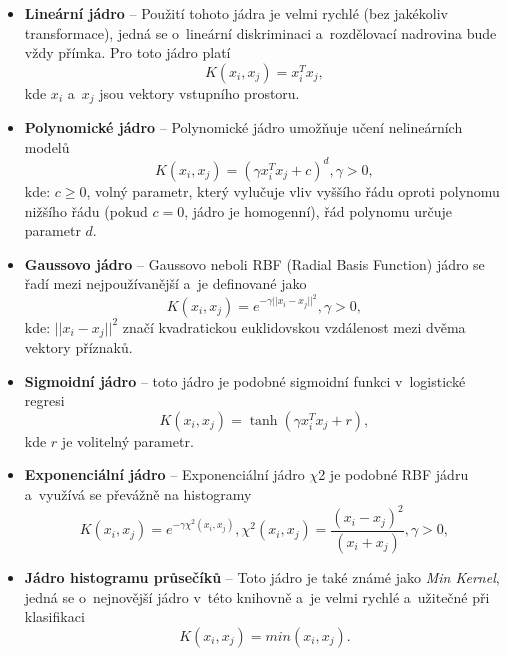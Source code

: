\begin{itemize}
    \item\textbf{Lineární jádro} --
          Použití tohoto jádra je velmi rychlé (bez jakékoliv transformace), jedná se o~lineární diskriminaci a~rozdělovací nadrovina bude vždy přímka. Pro toto jádro platí
          \begin{equation*}
              \label{linearK}
              K(x_i, x_j) = x_i^T x_j,
          \end{equation*}
          kde $x_i$ a~$x_j$ jsou vektory vstupního prostoru.

    \item\textbf{Polynomické jádro} --
          Polynomické jádro umožňuje učení nelineárních modelů
          \begin{equation*}
              \label{polyK}
              K(x_i, x_j) = (\gamma x_i^T x_j + c)^{d}, \gamma > 0,
          \end{equation*}
          kde: $c \geq 0$, volný parametr, který vylučuje vliv vyššího řádu oproti polynomu nižšího řádu (pokud $c = 0$, jádro je homogenní), řád polynomu určuje parametr $d$.

    \item\textbf{Gaussovo jádro} --
          Gaussovo neboli RBF (Radial Basis Function) jádro se řadí mezi nejpoužívanější a~je definované jako
          \begin{equation*}
              \label{RBFK}
              K(x_i, x_j) = e^{-\gamma ||x_i - x_j||^2}, \gamma > 0,
          \end{equation*}
          kde: $||x_i - x_j||^2$ značí kvadratickou euklidovskou vzdálenost mezi dvěma vektory příznaků.

    \item\textbf{Sigmoidní jádro} --
          toto jádro je podobné sigmoidní funkci v~logistické regresi
          \begin{equation*}
              \label{sigmK}
              K(x_i, x_j) = \tanh(\gamma x_i^T x_j + r),
          \end{equation*}
          kde $r$ je volitelný parametr.

    \item\textbf{Exponenciální jádro} --
          Exponenciální jádro $\chi$2 je podobné RBF jádru a~využívá se převážně na histogramy
          \begin{equation*}
              \label{expK}
              K(x_i, x_j) = e^{-\gamma \chi^2(x_i,x_j)}, \chi^2(x_i,x_j) = \frac{(x_i-x_j)^2}{(x_i+x_j)}, \gamma > 0,
          \end{equation*}

    \item\textbf{Jádro histogramu průsečíků} --
          Toto jádro je také známé jako \textit{Min Kernel}, jedná se o~nejnovější jádro v~této knihovně a~je velmi rychlé a~užitečné při klasifikaci
          \begin{equation*}
              \label{innK}
              K(x_i, x_j) = min(x_i,x_j).
          \end{equation*}
\end{itemize}

